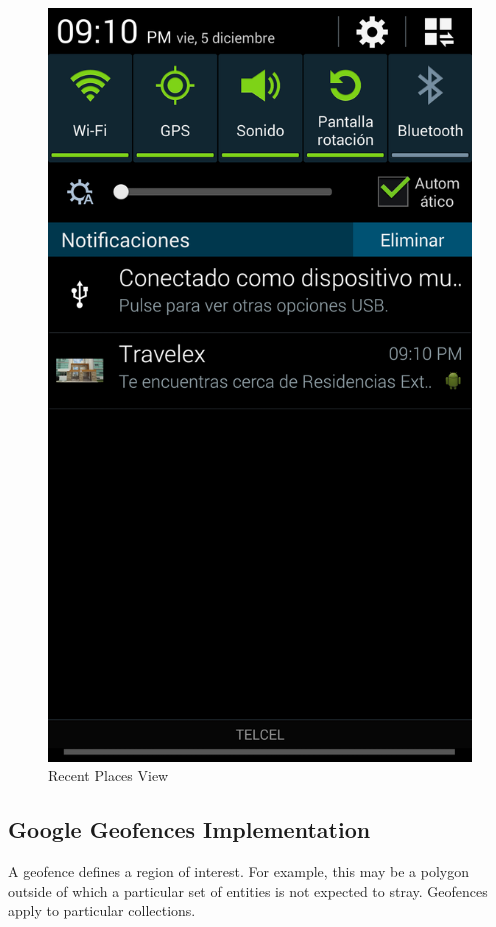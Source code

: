 \begin{figure}[ht]
  \centering
  \includegraphics[scale=0.08]{travelex_notification}
  \caption{Recent Places View}
  \label{fig_notification}
\end{figure}

\subsection{Google Geofences Implementation}
A geofence defines a region of interest. For example, this may be a polygon outside of which a particular set of entities is not expected to stray. Geofences apply to particular collections.\\

